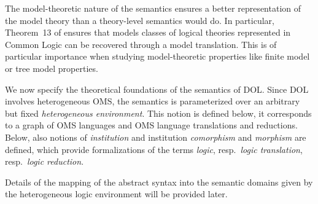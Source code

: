 \documentclass[10pt,%
\ifpretendfinal
final%
\else
draft%
\fi,
]{scrreprt}
\newcommand*{\termref}[1]{\textit{#1}}
\newcommand*{\institutionsOnly}{\bfseries\itshape}
\newcommand*{\syntax}[1]{\texttt{#1}}
\begin{document}
The model-theoretic nature of the semantics ensures a better representation
of the model theory than a theory-level semantics would do. In particular,
Theorem~13 of \cite{ThreeSemantics} ensures that models classes of logical 
theories represented in Common Logic can be recovered through a model
translation. This is of particular importance when studying model-theoretic
properties like finite model or tree model properties.




We now specify the theoretical foundations of the semantics of DOL. Since DOL involves 
heterogeneous OMS, the semantics is parameterized over an arbitrary but fixed \emph{heterogeneous 
environment}.  This notion is defined below, it corresponds to a graph of OMS languages and OMS 
language translations and reductions. Below, also notions of \emph{institution} and institution 
\emph{comorphism} and \emph{morphism} are defined, which provide formalizations of the terms 
\termref{logic}, resp.\ \termref{logic translation}, resp.\  \termref{logic reduction}. 


Details of the mapping of the abstract syntax into the semantic domains given by the heterogeneous 
logic environment will be provided later.


\end{document}
